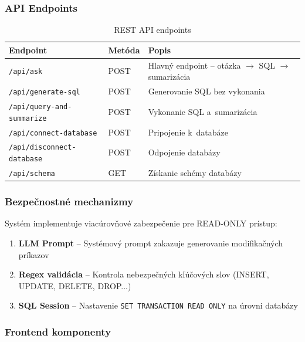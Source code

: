 \documentclass[a4paper, 12pt]{article}
\begin{document}
\subsubsection{API Endpoints}

\begin{table}[H]
\centering
\begin{tabular}{llp{6cm}}
\toprule
\textbf{Endpoint} & \textbf{Metóda} & \textbf{Popis} \\
\midrule
\texttt{/api/ask} & POST & Hlavný endpoint -- otázka $\rightarrow$ SQL $\rightarrow$ sumarizácia \\
\texttt{/api/generate-sql} & POST & Generovanie SQL bez vykonania \\
\texttt{/api/query-and-summarize} & POST & Vykonanie SQL a~sumarizácia \\
\texttt{/api/connect-database} & POST & Pripojenie k~databáze \\
\texttt{/api/disconnect-database} & POST & Odpojenie databázy \\
\texttt{/api/schema} & GET & Získanie schémy databázy \\
\bottomrule
\end{tabular}
\caption{REST API endpoints}
\end{table}

\subsubsection{Bezpečnostné mechanizmy}

Systém implementuje viacúrovňové zabezpečenie pre READ-ONLY prístup:

\begin{enumerate}
    \item \textbf{LLM Prompt} -- Systémový prompt zakazuje generovanie modifikačných príkazov
    \item \textbf{Regex validácia} -- Kontrola nebezpečných kľúčových slov (INSERT, UPDATE, DELETE, DROP...)
    \item \textbf{SQL Session} -- Nastavenie \texttt{SET TRANSACTION READ ONLY} na úrovni databázy
\end{enumerate}


\subsubsection{Frontend komponenty}
\end{document}

